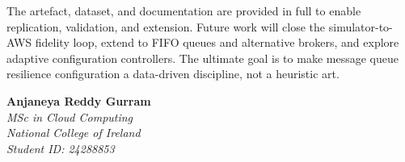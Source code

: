 The artefact, dataset, and documentation are provided in full to enable replication, validation, and extension. Future work will close the simulator-to-AWS fidelity loop, extend to FIFO queues and alternative brokers, and explore adaptive configuration controllers. The ultimate goal is to make message queue resilience configuration a data-driven discipline, not a heuristic art.

\vspace{1cm}

\noindent
\textbf{Anjaneya Reddy Gurram}\\
\textit{MSc in Cloud Computing}\\
\textit{National College of Ireland}\\
\textit{Student ID: 24288853}
